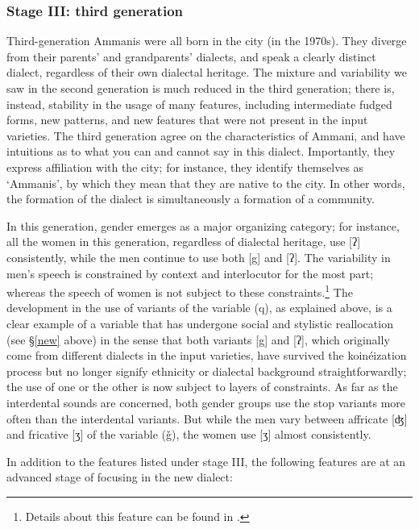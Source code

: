 \documentclass[output=paper]{langsci/langscibook}
\begin{document}
\subsubsection{Stage III: third generation}

Third-generation Ammanis were all born in the city (in the 1970s). They diverge from their parents’ and grandparents’ dialects, and speak a clearly distinct dialect, regardless of their own dialectal heritage. The mixture and variability we saw in the second generation is much reduced in the third generation; there is, instead, stability in the usage of many features, including intermediate fudged forms, new patterns, and new features that were not present in the input varieties. The third generation agree on the characteristics of Ammani, and have intuitions as to what you can and cannot say in this dialect. Importantly, they express affiliation with the city; for instance, they identify themselves as ‘Ammanis’, by which they mean that they are native to the city. In other words, the formation of the dialect is simultaneously a formation of a community.

In this generation, gender emerges as a major organizing category; for instance, all the women in this generation, regardless of dialectal heritage, use [ʔ] consistently, while the men continue to use both [g] and [ʔ]. The variability in men’s speech is constrained by context and interlocutor for the most part; whereas the speech of women is not subject to these constraints.\footnote{Details about this feature can be found in \citet{Al-WerHerin2011}.} The development in the use of variants of the variable (q), as explained above, is a clear example of a variable that has undergone social and stylistic reallocation (see §\ref{new} above) in the sense that both variants [g] and [ʔ], which originally come from different dialects in the input varieties, have survived the koinéization process but no longer signify ethnicity or dialectal background straightforwardly; the use of one or the other is now subject to layers of constraints. As far as the interdental sounds are concerned, both gender groups use the stop variants more often than the interdental variants. But while the men vary between affricate [ʤ] and fricative [ʒ] of the variable (ǧ), the women use [ʒ] almost consistently.

In addition to the features listed under stage III, the following features are at an advanced stage of focusing in the new dialect:
\end{document}
